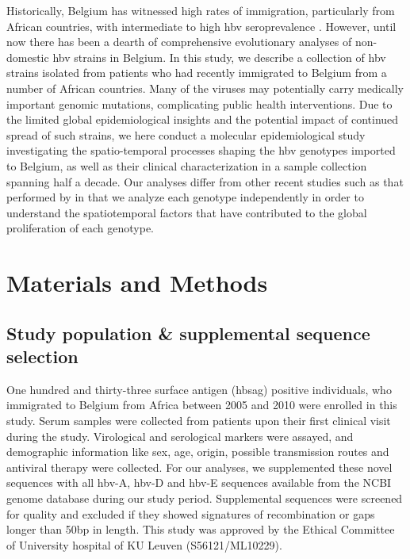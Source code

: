 Historically, Belgium has witnessed high rates of immigration, particularly from African countries, with intermediate to high \gls{hbv} seroprevalence \citep{schweitzer2015estimations}.
However, until now there has been a dearth of comprehensive evolutionary analyses of non-domestic \gls{hbv} strains in Belgium.
In this study, we describe a collection of \gls{hbv} strains isolated from patients who had recently immigrated to Belgium from a number of African countries.
Many of the viruses may potentially carry medically important genomic mutations, complicating public health interventions.
Due to the limited global epidemiological insights and the potential impact of continued spread of such strains, we here conduct a molecular epidemiological study investigating the spatio-temporal processes shaping the \gls{hbv} genotypes imported to Belgium, as well as their clinical characterization in a sample collection spanning half a decade.
Our analyses differ from other recent studies such as that performed by \citet{kocher_ten_2021} in that we analyze each genotype independently in order to understand the spatiotemporal factors that have contributed to the global proliferation of each genotype.


\section{Materials and Methods}
\subsection{Study population \& supplemental sequence selection}
One hundred and thirty-three surface antigen (\gls{hbsag}) positive individuals, who immigrated to Belgium from Africa between 2005 and 2010 were enrolled in this study.
Serum samples were collected from patients upon their first clinical visit during the study.
Virological and serological markers were assayed, and demographic information like sex, age, origin, possible transmission routes and antiviral therapy were collected.
For our analyses, we supplemented these novel sequences with all \gls{hbv}-A, \gls{hbv}-D and \gls{hbv}-E sequences available from the NCBI genome database \citep{sayers_database_2022} during our study period.
Supplemental sequences were screened for quality and excluded if they showed signatures of recombination or gaps longer than 50bp in length.
This study was approved by the Ethical Committee of University hospital of KU Leuven (S56121/ML10229).\\

